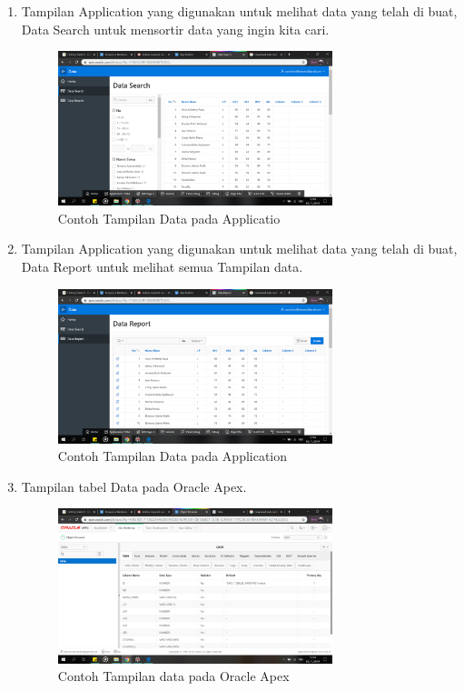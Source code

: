 \begin{enumerate}
\item Tampilan Application yang digunakan untuk melihat data yang telah di buat, Data Search untuk mensortir data yang ingin kita cari.
    \begin{figure}[!htbp]
    \centering
    \includegraphics[width=8cm]{picture/32.png}
    \caption{Contoh Tampilan Data pada Applicatio}
    \end{figure}
    
\newpage
\item Tampilan Application yang digunakan untuk melihat data yang telah di buat, Data Report untuk melihat semua Tampilan data.
\begin{figure}[!htbp]
    \centering
    \includegraphics[width=8cm]{picture/33.png}
    \caption{Contoh Tampilan Data pada Application}
    \end{figure}
    
\item Tampilan tabel Data pada Oracle Apex.
    \begin{figure}[!htbp]
    \centering
    \includegraphics[width=8cm]{picture/34.png}
    \caption{Contoh Tampilan data pada Oracle Apex}
    \end{figure}
    

\end{enumerate}
